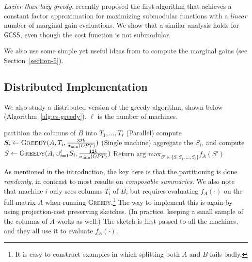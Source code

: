 \documentclass{article}
\newcommand{\argmax}{\text{arg max}}
\newcommand{\eps}{\varepsilon}
\newcommand{\greedy}{\textsc{Greedy}}
\newcommand{\distgreedy}{\textsc{Distgreedy}}
\newcommand{\gcss}{\textsf{GCSS}}
\begin{document}
\iffalse
\textbf{Random projections to reduce the number of rows.} We can project each column of $A$ and $B$ onto a random $O(\frac{k\log (\max(n', n_B))}{\eps^2})$ dimensional space, and then work with the resulting matrices. Thus we may assume that the number of rows in both $A$ and $B$ is $\min\{ m, O(\frac{k\log( \max(n', n_B))}{\eps^2}) \}$, which can be a big improvement. This can be obtained by a union bound on Lemma 10 from \cite{Sarlos}. (Full details in appendix.)
\fi

{\em Lazier-than-lazy greedy.}
\cite{Mirzasoleiman} recently proposed the first algorithm that achieves a constant factor approximation for maximizing submodular functions with a {\em linear} number of marginal gain evaluations. We show that a similar analysis holds for $\gcss$, even though the cost function is not submodular.

We also use some simple yet useful ideas from \cite{Farahat2} to compute the marginal gains (see Section~\ref{section-5}).

\subsection{Distributed Implementation}
We also study a distributed version of the greedy algorithm, shown below (Algorithm~\ref{alg:cs-greedy}). $\ell$ is the number of machines.

\begin{algorithm} \label{alg:cs-greedy}
\caption{$\distgreedy$($A$, $B$, $k$, $\ell$)}
\begin{algorithmic}[1]
 partition the columns of $B$ into $T_1, \dots, T_{\ell}$
\STATE (Parallel) compute $S_i \leftarrow \greedy(A, T_i, \frac{32k}{\sigma_{\min}(OPT)})$
\STATE (Single machine) aggregate the $S_i$, and compute $S \leftarrow \greedy(A, \cup_{i=1}^{\ell}S_i, \frac{12k}{\sigma_{\min}(OPT)})$
\STATE Return $\argmax_{S' \in \{S, S_1,\dots, S_{\ell}\}} f_A(S')$
\end{algorithmic}
\end{algorithm}

As mentioned in the introduction, the key here is that the partitioning is done {\em randomly}, in contrast to most results on {\em composable summaries}. We also note that machine $i$ only sees columns $T_i$ of $B$, but requires evaluating $f_A(\cdot)$ on the full matrix $A$ when running \greedy.\footnote{It is easy to construct examples in which splitting both $A$ and $B$ fails badly.} The way to implement this is again by using projection-cost preserving sketches. (In practice, keeping a small sample of the columns of $A$ works as well.) The sketch is first passed to all the machines, and they all use it to evaluate $f_A(\cdot)$.
\end{document}

